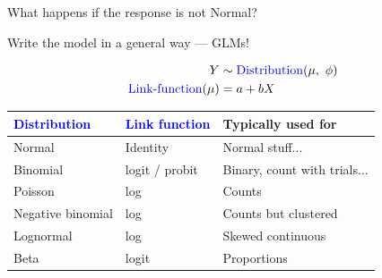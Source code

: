 \documentclass[12pt]{beamer}
\begin{document}
\begin{frame}{What happens if the response is not Normal?}
\begin{center}
Write the model in a general way --- GLMs!
\end{center}
\pause
\begin{align*}
Y &\sim \textcolor{blue}{\text{Distribution}}(\mu,~\phi) \\
\textcolor{blue}{\text{Link-function}}(\mu) &= a + bX
\end{align*}
\pause
\begin{table}
\centering
\begin{tabular}{lll}
\hline
\textcolor{blue}{Distribution} & \textcolor{blue}{Link function} & Typically used for \\
\hline
Normal & Identity & Normal stuff...\\
Binomial & logit / probit & Binary, count with trials...\\
Poisson & log & Counts \\
Negative binomial & log & Counts but clustered \\
Lognormal & log & Skewed continuous \\
Beta & logit & Proportions \\
\hline
\end{tabular}
\end{table}
\end{frame}
\end{document}
